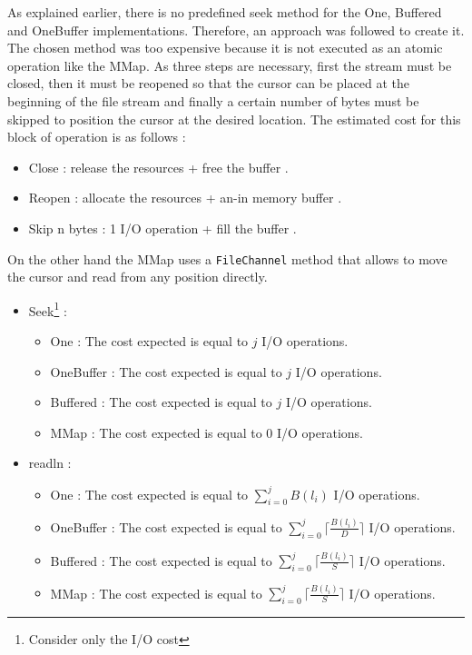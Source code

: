 \documentclass[12pt]{article}
\begin{document}
As explained earlier, there is no predefined seek method for the One, Buffered and OneBuffer implementations. Therefore, an approach was followed to create it. The chosen method was too expensive because it is not executed as an atomic operation like the MMap. As three steps are necessary, first the stream must be closed, then it must be reopened so that the cursor can be placed at the beginning of the file stream and finally a certain number of bytes must be skipped to position the cursor at the desired location. The estimated cost for this block of operation is as follows :
\begin{itemize}
    \item Close : release the resources + free the buffer \footnotemark.
    \item Reopen : allocate the resources + an-in memory buffer \footnotemark[\value{footnote}].
    \item Skip n bytes : 1 I/O operation + fill the buffer \footnotemark[\value{footnote}].
\end{itemize}
On the other hand the MMap uses a \texttt{FileChannel} method that allows to move the cursor and read from any position directly.

\begin{itemize}
    \item Seek\footnote{Consider only the I/O cost} :
    \begin{itemize}
        \item One : The cost expected is equal to $j$ I/O operations.
        \item OneBuffer : The cost expected is equal to $j$ I/O operations.
        \item Buffered : The cost expected is equal to $j$ I/O operations.
        \item MMap : The cost expected is equal to 0 I/O operations.
    \end{itemize}
    
    \item readln :
    \begin{itemize}
        \item One : The cost expected is equal to $\sum_{i=0}^{j} B(l_i)$ I/O operations.
        \item OneBuffer : The cost expected is equal to $\sum_{i=0}^{j} \lceil\frac{B(l_i)}{D}\rceil$ I/O operations.
        \item Buffered : The cost expected is equal to $\sum_{i=0}^{j} \lceil\frac{B(l_i)}{S}\rceil$ I/O operations.
        \item MMap : The cost expected is equal to $\sum_{i=0}^{j} \lceil\frac{B(l_i)}{S}\rceil$ I/O operations.
    \end{itemize}
\end{itemize}
\end{document}
